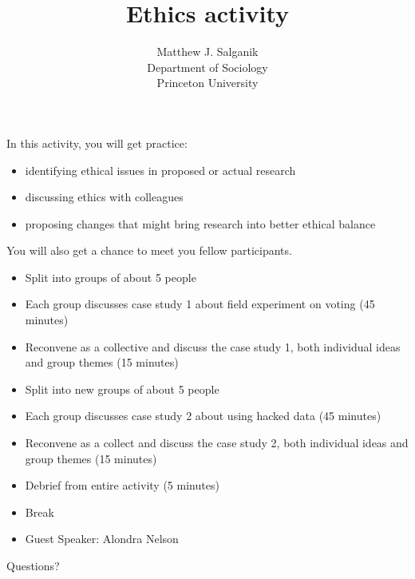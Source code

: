 \documentclass{beamer}
\title[]{Ethics activity}
\author[]{Matthew J. Salganik\\Department of Sociology\\Princeton University}
\date[]{Summer Institutes in Computational Social Science\\2020
\vfill
\begin{flushleft}
{\scriptsize
The Summer Institutes in Computational Social Science is supported by grants from the Russell Sage Foundation and the Alfred P. Sloan Foundation.}
\end{flushleft}
\begin{flushright}
\vspace{0.1in}
\texttt{[image: figures/cc-by.png]}
\end{flushright}
}
\begin{document}
\frame{\titlepage}
\begin{frame}

In this activity, you will get practice:
\begin{itemize}
\item identifying ethical issues in proposed or actual research
\pause
\item discussing ethics with colleagues
\pause
\item proposing changes that might bring research into better ethical balance
\end{itemize}
\pause
\vfill
You will also get a chance to meet you fellow participants.

\end{frame}
\begin{frame}

\begin{itemize}
\item Split into groups of about 5 people
\pause
\item Each group discusses case study 1 about field experiment on voting (45 minutes)
\pause
\item Reconvene as a collective and discuss the case study 1, both individual ideas and group themes (15 minutes)
\pause
\item Split into new groups of about 5 people
\pause
\item Each group discusses case study 2 about using hacked data (45 minutes)
\pause
\item Reconvene as a collect and discuss the case study 2, both individual ideas and group themes (15 minutes)
\pause
\item Debrief from entire activity (5 minutes)
\pause
\item Break
\pause
\item Guest Speaker: Alondra Nelson
\end{itemize}

\end{frame}
\begin{frame}

\begin{center}
\LARGE
Questions?
\end{center}

\end{frame}
\end{document}
